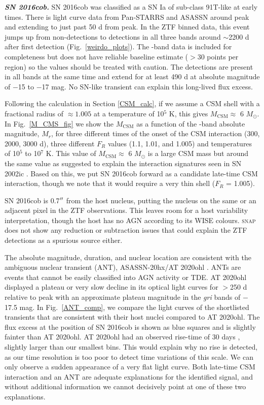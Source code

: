 \documentclass[a4paper,oneside,12pt, class=Latex/Classes/PhDthesisPSnPDF, crop=false]{standalone}
\begin{document}
\textit{\textbf{SN 2016cob.}}
SN 2016cob was classified as a SN Ia of sub-class 91T-like at early times. There is light curve data from Pan-STARRS and ASASSN around peak and extending to just past 50 d from peak. In the ZTF binned data, this event jumps up from non-detections to detections in all three bands around $\sim$2200 d after first detection (Fig.~\ref{weirdo_plots}). The \ztfi-band data is included for completeness but does not have reliable baseline estimate ($>$30 points per region) so the values should be treated with caution. The detections are present in all bands at the same time and extend for at least 490 d at absolute magnitude of $-$15 to $-$17 mag. No SN-like transient can explain this long-lived flux excess.

Following the calculation in Section \ref{CSM_calc}, if we assume a CSM shell with a fractional radius of $\approx 1.005$ at a temperature of 10$^5$ K, this gives $M_\text{CSM}\approx$ 6 $M_\odot$. In Fig.~\ref{M_CMS_fig} we show the $M_\text{CSM}$ as a function of the \ztfr-band absolute magnitude, $M_r$, for three different times of the onset of the CSM interaction (300, 2000, 3000 d), three different $F_R$ values (1.1, 1.01, and 1.005) and temperatures of 10$^5$ to 10$^7$ K. This value of $M_\text{CSM}\approx$ 6 $M_\odot$ is a large CSM mass but around the same value as suggested to explain the interaction signatures seen in SN 2002ic \citep{Hamuy_02ic}. Based on this, we put SN 2016cob forward as a candidate late-time CSM interaction, though we note that it would require a very thin shell ($F_R$ = 1.005).

SN 2016cob is 0.7$^{\prime\prime}$ from the host nucleus, putting the nucleus on the same or an adjacent pixel in the ZTF observations. This leaves room for a host variability interpretation, though the host has no AGN according to its WISE colours. \textsc{snap} does not show any reduction or subtraction issues that could explain the ZTF detections as a spurious source either. 

The absolute magnitude, duration, and nuclear location are consistent with the ambiguous nuclear transient (ANT), ASASSN-20hx/AT 2020ohl \citep{Hinkle_Extreme_nuclear_transients/ANTs}. ANTs are events that cannot be easily classified into AGN activity or TDE. AT 2020ohl displayed a plateau or very slow decline in its optical light curves for $>$250 d relative to peak with an approximate plateau magnitude in the \textit{gri} bands of $-$17.5 mag. In Fig.~\ref{ANT_comp}, we compare the light curves of the shortlisted transients that are consistent with their host nuclei compared to AT 2020ohl. The  flux excess at the position of SN 2016cob is shown as blue squares and is slightly fainter than AT 2020ohl.  AT 2020ohl had an observed rise-time of 30 days \citep{Hinkle_Extreme_nuclear_transients/ANTs}, slightly larger than our smallest bins. This would explain why no rise is detected, as our time resolution is too poor to detect time variations of this scale. We can only observe a sudden appearance of a very flat light curve. Both late-time CSM interaction and an ANT are adequate explanations for the identified signal, and without additional information we cannot decisively point at one of these two explanations.\\
\end{document}
